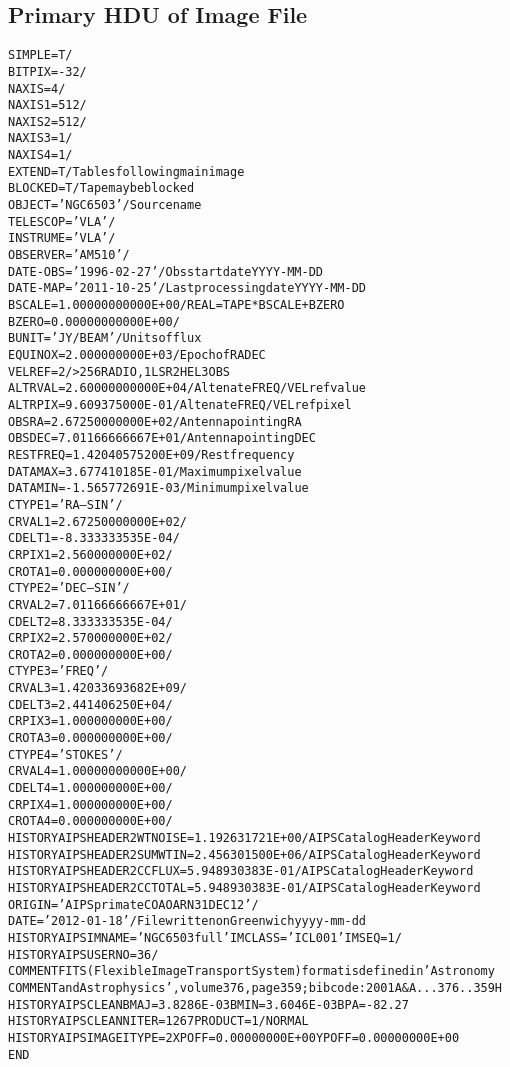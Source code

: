 \documentclass[twoside]{article}
\begin{document}
\subsection{Primary HDU of Image File}
\label{Appe:HDUimage}
\small
\begin{alltt}
SIMPLE  =                    T /
BITPIX  =                  -32 /
NAXIS   =                    4 /
NAXIS1  =                  512 /
NAXIS2  =                  512 /
NAXIS3  =                    1 /
NAXIS4  =                    1 /
EXTEND  =                    T /Tables following main image
BLOCKED =                    T /Tape may be blocked
OBJECT  = 'NGC6503 '           /Source name
TELESCOP= 'VLA     '           /
INSTRUME= 'VLA     '           /
OBSERVER= 'AM510   '           /
DATE-OBS= '1996-02-27'         /Obs start date YYYY-MM-DD
DATE-MAP= '2011-10-25'         /Last processing date YYYY-MM-DD
BSCALE  =    1.00000000000E+00 /REAL = TAPE * BSCALE + BZERO
BZERO   =    0.00000000000E+00 /
BUNIT   = 'JY/BEAM '           /Units of flux
EQUINOX =      2.000000000E+03 /Epoch of RA DEC
VELREF  =                    2 />256 RADIO, 1 LSR 2 HEL 3 OBS
ALTRVAL =    2.60000000000E+04 /Altenate FREQ/VEL ref value
ALTRPIX =      9.609375000E-01 /Altenate FREQ/VEL ref pixel
OBSRA   =    2.67250000000E+02 /Antenna pointing RA
OBSDEC  =    7.01166666667E+01 /Antenna pointing DEC
RESTFREQ=    1.42040575200E+09 /Rest frequency
DATAMAX =      3.677410185E-01 /Maximum pixel value
DATAMIN =     -1.565772691E-03 /Minimum pixel value
CTYPE1  = 'RA---SIN'           /
CRVAL1  =    2.67250000000E+02 /
CDELT1  =     -8.333333535E-04 /
CRPIX1  =      2.560000000E+02 /
CROTA1  =      0.000000000E+00 /
CTYPE2  = 'DEC--SIN'           /
CRVAL2  =    7.01166666667E+01 /
CDELT2  =      8.333333535E-04 /
CRPIX2  =      2.570000000E+02 /
CROTA2  =      0.000000000E+00 /
CTYPE3  = 'FREQ    '           /
CRVAL3  =    1.42033693682E+09 /
CDELT3  =      2.441406250E+04 /
CRPIX3  =      1.000000000E+00 /
CROTA3  =      0.000000000E+00 /
CTYPE4  = 'STOKES  '           /
CRVAL4  =    1.00000000000E+00 /
CDELT4  =      1.000000000E+00 /
CRPIX4  =      1.000000000E+00 /
CROTA4  =      0.000000000E+00 /
HISTORY AIPS HEADER2  WTNOISE  =  1.192631721E+00 /AIPS Catalog Header Keyword
HISTORY AIPS HEADER2  SUMWTIN  =  2.456301500E+06 /AIPS Catalog Header Keyword
HISTORY AIPS HEADER2  CCFLUX   =  5.948930383E-01 /AIPS Catalog Header Keyword
HISTORY AIPS HEADER2  CCTOTAL  =  5.948930383E-01 /AIPS Catalog Header Keyword
ORIGIN  = 'AIPSprimate      COAOARN              31DEC12'    /
DATE    = '2012-01-18'   / File written on Greenwich yyyy-mm-dd
HISTORY AIPS   IMNAME='NGC6503 full' IMCLASS='ICL001' IMSEQ=   1     /
HISTORY AIPS   USERNO=   36            /
COMMENT   FITS (Flexible Image Transport System) format is defined in 'Astronomy
COMMENT   and Astrophysics', volume 376, page 359; bibcode: 2001A&A...376..359H
HISTORY AIPS   CLEAN BMAJ=  3.8286E-03 BMIN=  3.6046E-03 BPA= -82.27
HISTORY AIPS   CLEAN NITER=     1267 PRODUCT=1   / NORMAL
HISTORY AIPS   IMAGE ITYPE=2 XPOFF=  0.00000000E+00 YPOFF=  0.00000000E+00
END
\end{alltt}
\end{document}

